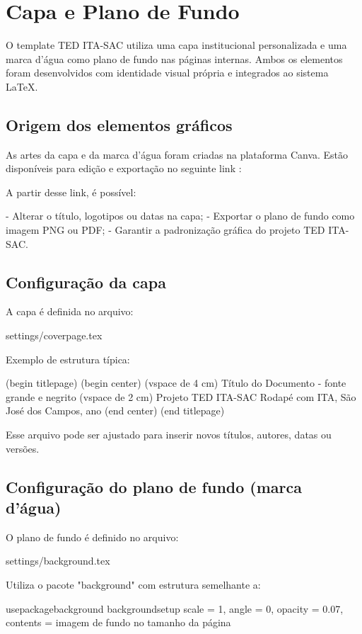\chapter{Capa e Plano de Fundo}

O template TED ITA-SAC utiliza uma capa institucional personalizada e uma marca d’água como plano de fundo nas páginas internas. Ambos os elementos foram desenvolvidos com identidade visual própria e integrados ao sistema LaTeX.

\section{Origem dos elementos gráficos}

As artes da capa e da marca d’água foram criadas na plataforma Canva. Estão disponíveis para edição e exportação no seguinte link :


A partir desse link, é possível:

- Alterar o título, logotipos ou datas na capa;
- Exportar o plano de fundo como imagem PNG ou PDF;
- Garantir a padronização gráfica do projeto TED ITA-SAC.

\section{Configuração da capa}

A capa é definida no arquivo:

settings/coverpage.tex

Exemplo de estrutura típica:

(begin titlepage)  
(begin center)  
(vspace de 4 cm)  
Título do Documento - fonte grande e negrito  
(vspace de 2 cm)  
Projeto TED ITA-SAC  
Rodapé com ITA, São José dos Campos, ano  
(end center)  
(end titlepage)


Esse arquivo pode ser ajustado para inserir novos títulos, autores, datas ou versões.

\section{Configuração do plano de fundo (marca d’água)}

O plano de fundo é definido no arquivo:

settings/background.tex

Utiliza o pacote "background" com estrutura semelhante a:

usepackage{background}  
backgroundsetup{  
	scale = 1,  
	angle = 0,  
	opacity = 0.07,  
	contents = {imagem de fundo no tamanho da página}  
}

